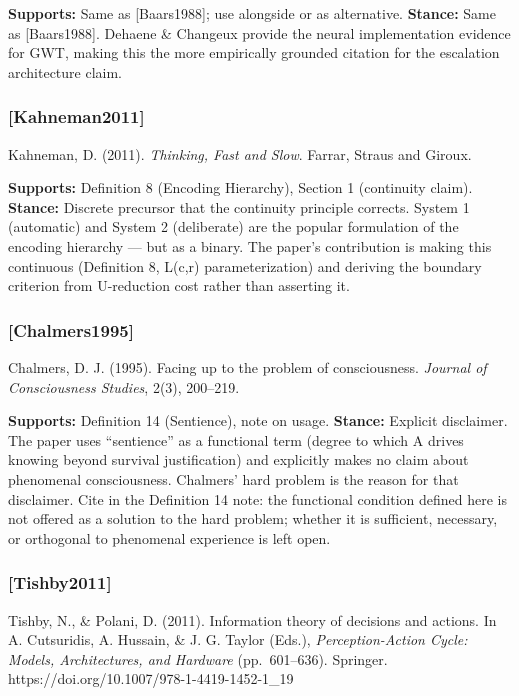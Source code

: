\documentclass[
]{article}
\begin{document}
\textbf{Supports:} Same as {[}Baars1988{]}; use alongside or as
alternative. \textbf{Stance:} Same as {[}Baars1988{]}. Dehaene \&
Changeux provide the neural implementation evidence for GWT, making this
the more empirically grounded citation for the escalation architecture
claim.

\subsubsection{{[}Kahneman2011{]}}\label{kahneman2011}

Kahneman, D. (2011). \emph{Thinking, Fast and Slow}. Farrar, Straus and
Giroux.

\textbf{Supports:} Definition 8 (Encoding Hierarchy), Section 1
(continuity claim). \textbf{Stance:} Discrete precursor that the
continuity principle corrects. System 1 (automatic) and System 2
(deliberate) are the popular formulation of the encoding hierarchy ---
but as a binary. The paper's contribution is making this continuous
(Definition 8, L(c,r) parameterization) and deriving the boundary
criterion from U-reduction cost rather than asserting it.

\subsubsection{{[}Chalmers1995{]}}\label{chalmers1995}

Chalmers, D. J. (1995). Facing up to the problem of consciousness.
\emph{Journal of Consciousness Studies}, 2(3), 200--219.

\textbf{Supports:} Definition 14 (Sentience), note on usage.
\textbf{Stance:} Explicit disclaimer. The paper uses ``sentience'' as a
functional term (degree to which A drives knowing beyond survival
justification) and explicitly makes no claim about phenomenal
consciousness. Chalmers' hard problem is the reason for that disclaimer.
Cite in the Definition 14 note: the functional condition defined here is
not offered as a solution to the hard problem; whether it is sufficient,
necessary, or orthogonal to phenomenal experience is left open.

\subsubsection{{[}Tishby2011{]}}\label{tishby2011}

Tishby, N., \& Polani, D. (2011). Information theory of decisions and
actions. In A. Cutsuridis, A. Hussain, \& J. G. Taylor (Eds.),
\emph{Perception-Action Cycle: Models, Architectures, and Hardware}
(pp.~601--636). Springer. https://doi.org/10.1007/978-1-4419-1452-1\_19
\end{document}
